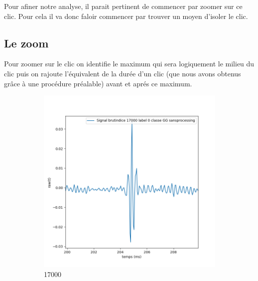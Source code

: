 Pour afiner notre analyse, il parait pertinent de commencer par zoomer sur ce clic.
Pour cela il va donc faloir commencer par trouver un moyen d'isoler le clic.

\hypertarget{Le-zoom}{%
\subsection{Le zoom}
\label{Le-zoom}}

Pour zoomer sur le clic on identifie le maximum qui sera logiquement le milieu du clic puis on rajoute l'équivalent de la durée d'un clic (que nous avons obtenus grâce à une procédure préalable) avant et aprés ce maximum.


\begin{figure}[!h]
  \centering
  \begin{subfigure}[b]{0.3\textwidth}
    \includegraphics[width=\textwidth]{./images/indice17000Spectro1Dlabel0classeGGsansprocessingaveczoom.png}
    \caption{17000}
  \end{subfigure}
  \begin{subfigure}[b]{0.3\textwidth}

\end{subfigure}
\end{figure}
